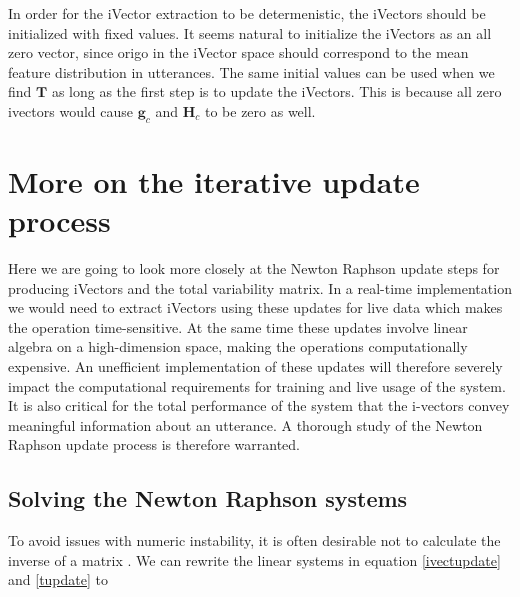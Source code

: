 In order for the iVector extraction to be determenistic, the iVectors should be initialized with fixed values. It seems natural to initialize the iVectors as an all zero vector, since origo in the iVector space should correspond to the mean feature distribution in utterances. The same initial values can be used when we find $\mathbf{T}$ as long as the first step is to update the iVectors. This is because all zero ivectors would cause $\mathbf{g}_c$ and $\mathbf{H}_c$ to be zero as well.

\section{More on the iterative update process}
\label{sect:deeperivect}

Here we are going to look more closely at the Newton Raphson update steps for producing iVectors and the total variability matrix. In a real-time implementation we would need to extract iVectors using these updates for live data which makes the operation time-sensitive. At the same time these updates involve linear algebra on a high-dimension space, making the operations computationally expensive. An unefficient implementation of these updates will therefore severely impact the computational requirements for training and live usage of the system. It is also critical for the total performance of the system that the i-vectors convey meaningful information about an utterance. A thorough study of the Newton Raphson update process is therefore warranted. 

\subsection{Solving the Newton Raphson systems}
\label{sect:solvivect}

To avoid issues with numeric instability, it is often desirable not to calculate the inverse of a matrix \cite[p. 743]{cormen}. We can rewrite the linear systems in equation \ref{ivectupdate} and \ref{tupdate} to

